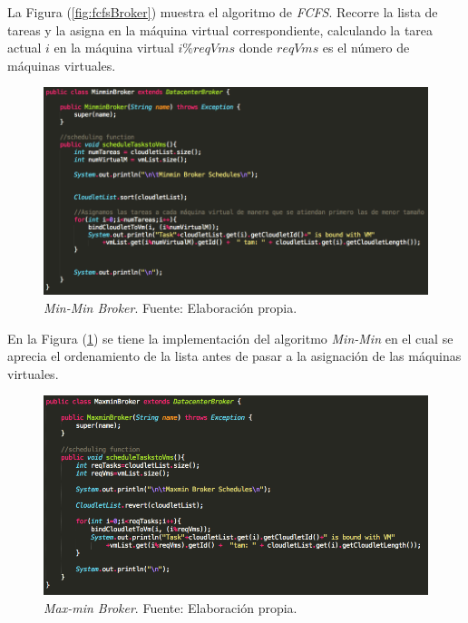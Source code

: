 La Figura (\ref{fig:fcfsBroker}) muestra el algoritmo de \textit{FCFS}. Recorre la lista de tareas y la asigna en la m\'aquina virtual correspondiente, calculando la tarea actual $i$ en la m\'aquina virtual \textbf{$i\%reqVms$} donde \textbf{$reqVms$} es el n\'umero de m\'aquinas virtuales.

\renewcommand\thefigure{\arabic{figure}}
\begin{figure}[h!]
	\centering
	\includegraphics[scale=0.4]{media/minmin_broker}
	\caption{\textit{Min-Min Broker}. Fuente: Elaboración propia.}
	\label{fig:minminBroker}
\end{figure}

\newpage

En la Figura (\ref{fig:minminBroker}) se tiene la implementaci\'on del algoritmo \textit{Min-Min} en el cual se aprecia el ordenamiento de la lista antes de pasar a  la asignaci\'on de las m\'aquinas virtuales.

\newpage
\renewcommand\thefigure{\arabic{figure}}
\begin{figure}[h!]
	\centering
	\includegraphics[scale=0.4]{media/maxmin_broker}
	\caption{\textit{Max-min Broker}. Fuente: Elaboración propia.}
	\label{fig:maxminBroker}
\end{figure}

